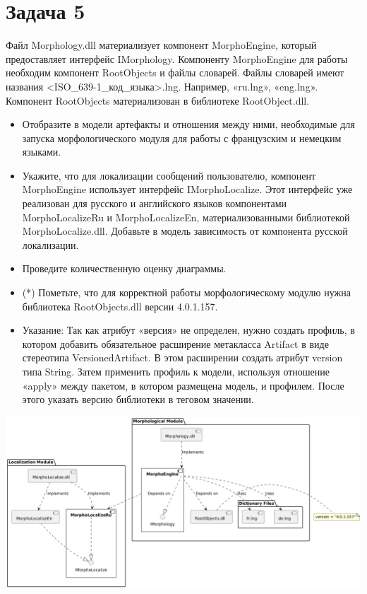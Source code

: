 \documentclass{article}
\begin{document}
\section{Задача 5}
Файл Morphology.dll материализует компонент MorphoEngine, который предоставляет интерфейс IMorphology. Компоненту MorphoEngine для работы необходим компонент RootObjects и файлы словарей. Файлы словарей имеют названия <ISO\_639-1\_код\_языка>.lng. Например, «ru.lng», «eng.lng». Компонент RootObjects материализован в библиотеке RootObject.dll.
\begin{itemize}
    \item Отобразите в модели артефакты и отношения между ними, необходимые для запуска морфологического модуля для работы с французским и немецким языками.
    \item Укажите, что для локализации сообщений пользователю, компонент MorphoEngine использует интерфейс IMorphoLocalize. Этот интерфейс уже реализован для русского и английского языков компонентами  MorphoLocalizeRu и MorphoLocalizeEn, материализованными библиотекой MorphoLocalize.dll. Добавьте в модель зависимость от компонента русской локализации.
    \item Проведите количественную оценку диаграммы.
    \item (*) Пометьте, что для корректной работы морфологическому модулю нужна библиотека RootObjects.dll версии 4.0.1.157.
    \item Указание: Так как атрибут «версия» не определен, нужно создать профиль, в котором добавить обязательное расширение метакласса Artifact в виде стереотипа VersionedArtifact. В этом расширении создать атрибут version типа String. Затем применить профиль к модели, используя отношение «apply» между пакетом, в котором размещена модель, и профилем. После этого указать версию библиотеки в теговом значении.
\end{itemize}

\includegraphics[width=\textwidth]{5.png}
\end{document}
